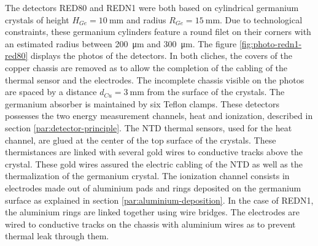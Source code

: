 The detectors RED80 and REDN1 were both based on cylindrical germanium crystals of height $H_{Ge} = \SI{10}{\mm}$ and radius $R_{Ge} = \SI{15}{\mm}$. Due to technological constraints, these germanium cylinders feature a round filet on their corners with an estimated radius between \SI{200}{\micro\metre} and \SI{300}{\micro\metre}. The figure \ref{fig:photo-redn1-red80} displays the photos of the detectors. In both cliches, the covers of the copper chassis are removed as to allow the completion of the cabling of the thermal sensor and the electrodes. The incomplete chassis visible on the photos are spaced by a distance $d_{Cu} = \SI{3}{\mm}$ from the surface of the crystals. The germanium absorber is maintained by six Teflon clamps.
These detectors possesses the two energy measurement channels, heat and ionization, described in section \ref{par:detector-principle}. The NTD thermal sensors, used for the heat channel, are glued at the center of the top surface of the crystals. These thermistances are linked with several gold wires to conductive tracks above the crystal. These gold wires assured the electric cabling of the NTD as well as the thermalization of the germanium crystal. The ionization channel consists in electrodes made out of aluminium pads and rings deposited on the germanium surface as explained in section \ref{par:aluminium-deposition}. In the case of REDN1, the aluminium rings are linked together using wire bridges. The electrodes are wired to conductive tracks on the chassis with aluminium wires as to prevent thermal leak through them.

